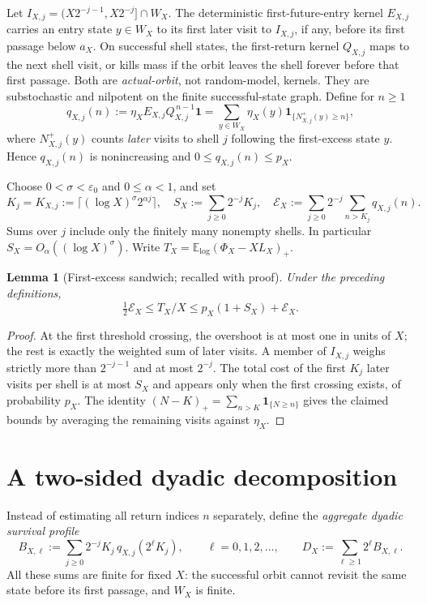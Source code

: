 \documentclass[11pt,a4paper]{article}
\newtheorem{lemma}[theorem]{Lemma}
\theoremstyle{remark}
\newcommand{\one}{\mathbf 1}
\newcommand{\Ex}{\mathcal E}
\begin{document}
Let $I_{X,j}=(X2^{-j-1},X2^{-j}]\cap W_X$.
The deterministic first-future-entry kernel $E_{X,j}$ carries an entry
state $y\in W_X$ to its first later visit to $I_{X,j}$, if any, before
its first passage below $a_X$.  On successful shell states, the
first-return kernel $Q_{X,j}$ maps to the next shell visit, or kills
mass if the orbit leaves the shell forever before that first passage.
Both are \emph{actual-orbit}, not random-model, kernels.  They are
substochastic and nilpotent on the finite successful-state graph.
Define for $n\ge1$
\begin{equation}\label{eq:q-def}
q_{X,j}(n):=\eta_X E_{X,j}Q_{X,j}^{\,n-1}\one
 =\sum_{y\in W_X}\eta_X(y)\one_{\{N^+_{X,j}(y)\ge n\}},
\end{equation}
where $N^+_{X,j}(y)$ counts \emph{later} visits to shell $j$
following the first-excess state $y$.  Hence $q_{X,j}(n)$ is
nonincreasing and $0\le q_{X,j}(n)\le p_X$.

Choose $0<\sigma<\varepsilon_0$ and $0\le\alpha<1$, and set
\begin{equation}\label{eq:allowances}
K_j=K_{X,j}:=\big\lceil(\log X)^\sigma2^{\alpha j}\big\rceil,\quad
S_X:=\sum_{j\ge0}2^{-j}K_j,
\quad
\Ex_X:=\sum_{j\ge0}2^{-j}\sum_{n>K_j}q_{X,j}(n).
\end{equation}
Sums over $j$ include only the finitely many nonempty shells.  In
particular $S_X=O_{\alpha}((\log X)^\sigma)$.
Write $T_X=\mathbb E_{\log}(\Phi_X-XL_X)_+$.

\begin{lemma}[First-excess sandwich; recalled with proof]\label{lem:sandwich}
Under the preceding definitions,
\begin{equation}\label{eq:sandwich}
\tfrac12\Ex_X\le T_X/X\le p_X(1+S_X)+\Ex_X.
\end{equation}
\end{lemma}
\begin{proof}
At the first threshold crossing, the overshoot is at most one in
units of $X$; the rest is exactly the weighted sum of later visits.
A member of $I_{X,j}$ weighs strictly more than $2^{-j-1}$ and at most
$2^{-j}$.  The total cost of the first $K_j$ later visits per shell is
at most $S_X$ and appears only when the first crossing exists, of
probability $p_X$.  The identity
$(N-K)_+=\sum_{n>K}\one_{\{N\ge n\}}$ gives the claimed bounds
by averaging the remaining visits against $\eta_X$.
\end{proof}

\section{A two-sided dyadic decomposition}
Instead of estimating all return indices $n$ separately, define the
\emph{aggregate dyadic survival profile}
\begin{equation}\label{eq:B-def}
B_{X,\ell}:=\sum_{j\ge0}2^{-j}K_j\,
 q_{X,j}(2^\ell K_j),\qquad \ell=0,1,2,\ldots,
\qquad D_X:=\sum_{\ell\ge1}2^\ell B_{X,\ell}.
\end{equation}
All these sums are finite for fixed $X$: the successful orbit cannot
revisit the same state before its first passage, and $W_X$ is finite.
\end{document}
